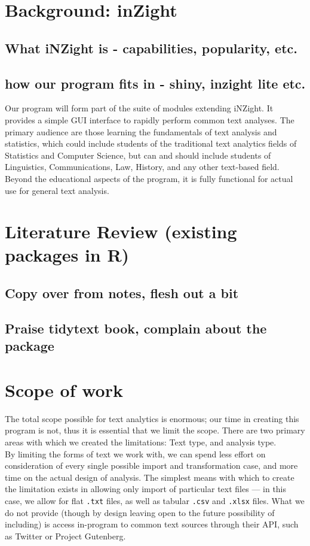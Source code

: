\documentclass[11pt, a4paper, oneside]{report}
\begin{document}
\section{Background: inZight}
\label{sec:background:-inzight}
\subsection{What iNZight is - capabilities, popularity, etc.}
\subsection{how our program fits in - shiny, inzight lite etc.}
Our program will form part of the suite of modules extending iNZight.
It provides a simple GUI interface to rapidly perform common text
analyses. The primary audience are those learning the fundamentals of
text analysis and statistics, which could include students of the
traditional text analytics fields of Statistics and Computer Science,
but can and should include students of Linguistics, Communications, Law,
History, and any other text-based field. Beyond the educational
aspects of the program, it is fully functional for actual use for
general text analysis.
\section{Literature Review (existing packages in R)}
\label{sec:liter-revi-exist}

\subsection{Copy over from notes, flesh out a bit}

\subsection{Praise tidytext book, complain about the package}

\section{Scope of work}
\label{sec:scope-work}
The total scope possible for text analytics is enormous; our time in
creating this program is not, thus it is essential that we limit the
scope. There are two primary areas with which we created the
limitations: Text type, and analysis type.\\

By limiting the forms of text we work with, we can spend less effort on consideration of every single possible import and transformation case, and more time on the actual design of analysis. The simplest means with which to create the limitation exists in allowing only import of particular text files --- in this case, we allow for flat \texttt{.txt} files, as well as tabular \texttt{.csv} and \texttt{.xlsx} files. What we do not provide (though by design leaving open to the future possibility of including) is access in-program to common text sources through their API, such as Twitter or Project Gutenberg.\\
\end{document}
